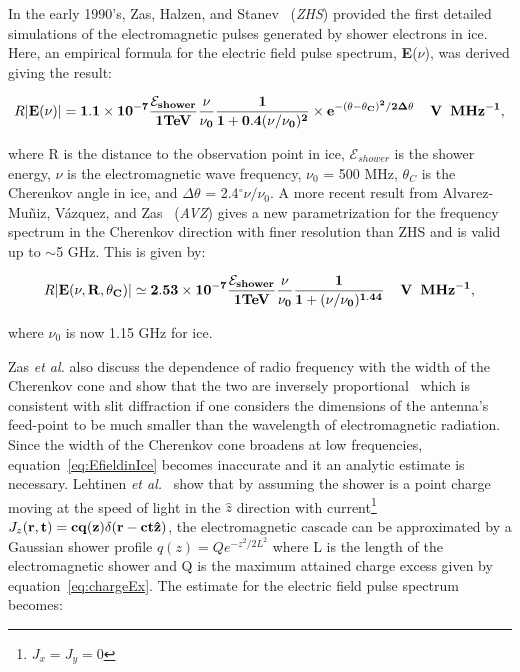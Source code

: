 \par In the early 1990's, Zas, Halzen, and Stanev~\cite{Zas.1992} (\textit{ZHS}) provided the first detailed simulations of the electromagnetic pulses generated by shower electrons in ice.  Here, an empirical formula for the electric field pulse spectrum, \textbf{E}($\nu$), was derived giving the result:

\begin{equation}
\label{eq:EfieldinIce}
R|\bf{E}(\nu)| = 1.1 \times 10^{-7}\frac{\mathcal{E}_{shower}}{1 TeV}\frac{\nu}{\nu_0}\frac{1}{1 + 0.4(\nu/\nu_0)^2} \times e^{-(\theta - \theta_{C})^2/2\Delta\theta} \hspace{4mm} V \hspace{2mm}MHz^{-1},
\end{equation}

\noindent where R is the distance to the observation point in ice, $\mathcal{E}_{shower}$ is the shower energy, $\nu$ is the electromagnetic wave frequency, $\nu_0$ = 500 MHz, $\theta_{C}$ is the Cherenkov angle in ice, and $\Delta\theta$ = 2.4$^\circ \nu/\nu_0$.  A more recent result from Alvarez-Mu\~{n}iz, V\'{a}zquez, and Zas~\cite{Alvarez.2000} (\textit{AVZ}) gives a new parametrization for the frequency spectrum in the Cherenkov direction with finer resolution than ZHS and is valid up to $\sim$5 GHz.  This is given by:

\begin{equation}
\label{eq:zhs}
R|\bf{E}(\nu,R,\theta_C)| \simeq 2.53 \times 10^{-7}\frac{\mathcal{E}_{shower}}{1 TeV}\frac{\nu}{\nu_0}\frac{1}{1 + (\nu/\nu_0)^{1.44}} \hspace{4mm} V \hspace{2mm}MHz^{-1},
\end{equation}

\noindent where $\nu_0$ is now 1.15 GHz for ice.

\par Zas \textit{et al.} also discuss the dependence of radio frequency with the width of the Cherenkov cone and show that the two are inversely proportional~\cite{Zas.1992} which is consistent with slit diffraction if one considers the dimensions of the antenna's feed-point to be much smaller than the wavelength of electromagnetic radiation.  Since the width of the Cherenkov cone broadens at low frequencies, equation~\ref{eq:EfieldinIce} becomes inaccurate and it an analytic estimate is necessary.  Lehtinen \textit{et al.}~\cite{FORTE.2004} show that by assuming the shower is a point charge moving at the speed of light in the $\hat{z}$ direction with current\footnote{$J_x = J_y = 0$} $J_{z}(\bf{r},t) = cq(z)\delta(\bf{r}-ct\hat{z})$, the electromagnetic cascade can be approximated by a Gaussian shower profile $q(z) = Qe^{-z^{2}/2L^{2}}$ where L is the length of the electromagnetic shower and Q is the maximum attained charge excess given by equation~\ref{eq:chargeEx}.  The estimate for the electric field pulse spectrum becomes:

